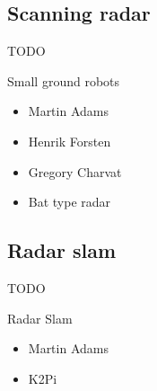 \subsection{Scanning radar}\label{scanning-radar}

TODO

Small ground robots

\begin{itemize}
\item
  Martin Adams
\item
  Henrik Forsten
\item
  Gregory Charvat
\item
  Bat type radar
\end{itemize}

\subsection{Radar slam}\label{radar-slam}

TODO

Radar Slam

\begin{itemize}
\item
  Martin Adams
\item
  K2Pi
\end{itemize}
